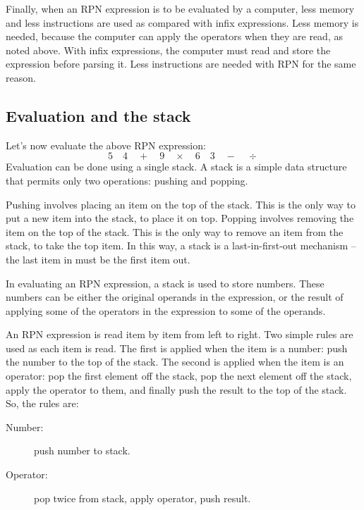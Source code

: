 \documentclass[twocolumn]{iagproc}
\begin{document}
Finally, when an RPN expression is to be evaluated by a computer, less memory and less instructions are used as compared with infix expressions.
Less memory is needed, because the computer can apply the operators when they are read, as noted above.
With infix expressions, the computer must read and store the expression before parsing it.
Less instructions are needed with RPN for the same reason.

\subsection*{Evaluation and the stack}
Let's now evaluate the above RPN expression:
$$ 5 \quad 4 \quad + \quad 9 \quad \times \quad  6 \quad 3 \quad - \quad \div $$
Evaluation can be done using a single stack.
A stack is a simple data structure that permits only two operations: pushing and popping.

Pushing involves placing an item on the top of the stack.
This is the only way to put a new item into the stack, to place it on top.
Popping involves removing the item on the top of the stack.
This is the only way to remove an item from the stack, to take the top item.
In this way, a stack is a last-in-first-out mechanism -- the last item in must be the first item out.

In evaluating an RPN expression, a stack is used to store numbers.
These numbers can be either the original operands in the expression, or the result of applying some of the operators in the expression to some of the operands.

An RPN expression is read item by item from left to right.
Two simple rules are used as each item is read.
The first is applied when the item is a number: push the number to the top of the stack.
The second is applied when the item is an operator: pop the first element off the stack, pop the next element off the stack, apply the operator to them, and finally push the result to the top of the stack.
So, the rules are:
\begin{description}
  \item[Number:] push number to stack.
  \item[Operator:] pop twice from stack, apply operator, push result.
\end{description}
\end{document}
